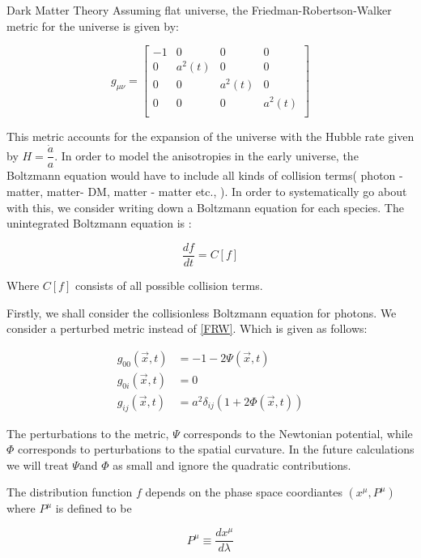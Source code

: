 \documentclass[10pt,a4paper]{book}
\begin{document}
\begin{chapter}{Dark Matter Theory}
		Assuming flat universe, the Friedman-Robertson-Walker metric for the universe is given by:
		
		\begin{equation}\label{FRW}
		g_{\mu \nu} = \begin{bmatrix}
		-1&0&0&0\\
		0& a^2(t) & 0 & 0\\
		0 & 0 & a^2(t) & 0\\
		0 & 0 & 0 & a^2 (t) \\ 
		\end{bmatrix}
		\end{equation}
		
		This metric accounts for the expansion of the universe with the Hubble rate given by $ H = \dfrac{\dot{a}}{a} $. In order to model the anisotropies in the early universe, the Boltzmann equation would have to include all kinds of collision terms( photon - matter, matter- DM, matter - matter etc., ). In order to systematically go about with this, we consider writing down a Boltzmann equation for each species. The unintegrated Boltzmann equation is :
		
		\begin{equation}\label{key}
		\dfrac{df}{dt } = C[f]
		\end{equation}	 
		
		Where $ C[f] $ consists of all possible collision terms. 
		
		Firstly, we shall consider the collisionless Boltzmann equation for photons.    We consider a perturbed metric instead of \ref{FRW}. Which is given as follows: 
		
		\begin{align}
		g_{00}(\vec{x},t) &  = -1 -2 \Psi(\vec{x},t)\\
		g_{0i}(\vec{x},t) &  = 0\\
		g_{ij}(\vec{x},t) &  = a^2 \delta_{ij}(1+2\Phi(\vec{x},t))
		\end{align}
		
		The perturbations to the metric, $ \Psi $ corresponds to the Newtonian potential, while $ \Phi $ corresponds to perturbations to the spatial curvature. In the future calculations we will treat  $ \Psi $and   $ \Phi $ as small and ignore the quadratic contributions. 
		
		The distribution function $ f $ depends on the phase space coordiantes $ (x^\mu , P^\mu) $ where $ P^\mu $ is defined to be 
		
		\begin{equation}\label{key}
		P^\mu \equiv  \dfrac{dx^\mu}{d\lambda}
		\end{equation}
		

\end{chapter}
\end{document}
